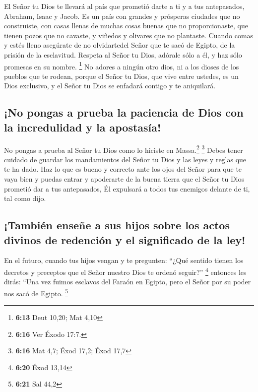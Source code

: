  El Señor tu Dios te llevará al país que prometió darte a
ti y a tus antepasados, Abraham, Isaac y Jacob. Es un país con grandes y
prósperas ciudades que no construiste,  con casas llenas
de muchas cosas buenas que no proporcionaste, que tienen pozos que no
cavaste, y viñedos y olivares que no plantaste. Cuando comas y estés
lleno  asegúrate de no olvidartedel Señor que te sacó de
Egipto, de la prisión de la esclavitud.  Respeta al Señor
tu Dios, adórale sólo a él, y haz sólo promesas en su nombre.
\footnote{\textbf{6:13} Deut 10,20; Mat 4,10}  No adores
a ningún otro dios, ni a los dioses de los pueblos que te rodean,
 porque el Señor tu Dios, que vive entre ustedes, es un
Dios exclusivo, y el Señor tu Dios se enfadará contigo y te aniquilará.

\hypertarget{no-pongas-a-prueba-la-paciencia-de-dios-con-la-incredulidad-y-la-apostasuxeda}{%
\subsection{¡No pongas a prueba la paciencia de Dios con la incredulidad
y la
apostasía!}\label{no-pongas-a-prueba-la-paciencia-de-dios-con-la-incredulidad-y-la-apostasuxeda}}

 No pongas a prueba al Señor tu Dios como lo hiciste en
Massa.\footnote{\textbf{6:16} Ver Éxodo 17:7.} \footnote{\textbf{6:16}
  Mat 4,7; Éxod 17,2; Éxod 17,7}  Debes tener cuidado de
guardar los mandamientos del Señor tu Dios y las leyes y reglas que te
ha dado.  Haz lo que es bueno y correcto ante los ojos
del Señor para que te vaya bien y puedas entrar y apoderarte de la buena
tierra que el Señor tu Dios prometió dar a tus antepasados,
 Él expulsará a todos tus enemigos delante de ti, tal
como dijo.

\hypertarget{tambiuxe9n-enseuxf1e-a-sus-hijos-sobre-los-actos-divinos-de-redenciuxf3n-y-el-significado-de-la-ley}{%
\subsection{¡También enseñe a sus hijos sobre los actos divinos de
redención y el significado de la
ley!}\label{tambiuxe9n-enseuxf1e-a-sus-hijos-sobre-los-actos-divinos-de-redenciuxf3n-y-el-significado-de-la-ley}}

 En el futuro, cuando tus hijos vengan y te pregunten:
``¿Qué sentido tienen los decretos y preceptos que el Señor nuestro Dios
te ordenó seguir?'' \footnote{\textbf{6:20} Éxod 13,14} 
entonces les dirás: ``Una vez fuimos esclavos del Faraón en Egipto, pero
el Señor por su poder nos sacó de Egipto. \footnote{\textbf{6:21} Sal
  44,2}

